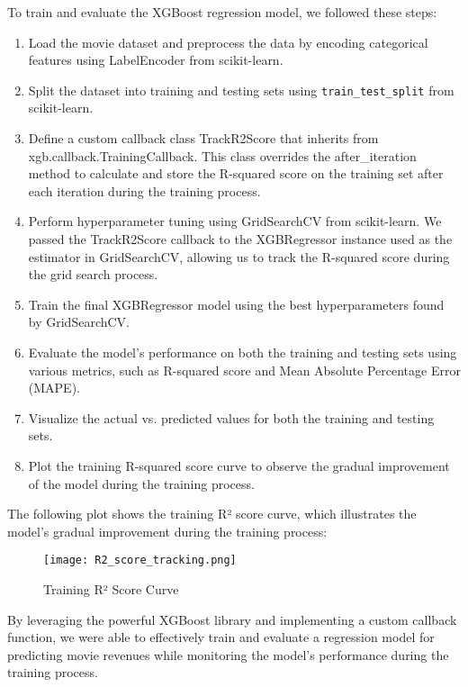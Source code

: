 \documentclass[conference]{IEEEtran}
\begin{document}
        To train and evaluate the XGBoost regression model, we followed these steps:
        \begin{enumerate}
        \item Load the movie dataset and preprocess the data by encoding categorical features using LabelEncoder from scikit-learn.
        \item Split the dataset into training and testing sets using \texttt{train\_test\_split} from scikit-learn.
        \item Define a custom callback class TrackR2Score that inherits from xgb.callback.TrainingCallback. This class overrides the after\_iteration method to calculate and store the R-squared score on the training set after each iteration during the training process.
        \item Perform hyperparameter tuning using GridSearchCV from scikit-learn. We passed the TrackR2Score callback to the XGBRegressor instance used as the estimator in GridSearchCV, allowing us to track the R-squared score during the grid search process.
        \item Train the final XGBRegressor model using the best hyperparameters found by GridSearchCV.
        \item Evaluate the model's performance on both the training and testing sets using various metrics, such as R-squared score and Mean Absolute Percentage Error (MAPE).
        \item Visualize the actual vs. predicted values for both the training and testing sets.
        \item Plot the training R-squared score curve to observe the gradual improvement of the model during the training process.
        \end{enumerate}
    The following plot shows the training R² score curve, which illustrates the model's gradual improvement during the training process:
    \begin{figure}[h]
        \centering
        \texttt{[image: R2\_score\_tracking.png]}
        \caption{Training R² Score Curve}
        \label{fig:xg_boost_track}
    \end{figure}
    By leveraging the powerful XGBoost library and implementing a custom callback function, we were able to effectively train and evaluate a regression model for predicting movie revenues while monitoring the model's performance during the training process.

    
\end{document}
